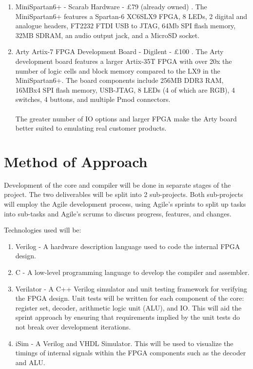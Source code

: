 \documentclass[11pt,a4paper]{article}
\begin{document}
\begin{enumerate}
\item{MiniSpartan6+ - Scarab Hardware - £79 (already owned) \citep{scarabhardware}. The MiniSpartan6+ features a Spartan-6 XC6SLX9 FPGA, 8 LEDs, 2 digital and analogue headers, FT2232 FTDI USB to JTAG, 64Mb SPI flash memory, 32MB SDRAM, an audio output jack, and a MicroSD socket.}

\item{Arty Artix-7 FPGA Development Board - Digilent - £100 \citep{arty}. The Arty development board features a larger Artix-35T FPGA with over 20x the number of logic cells and block memory compared to the LX9 in the MiniSpartan6+. The board components include 256MB DDR3 RAM, 16MBx4 SPI flash memory, USB-JTAG, 8 LEDs (4 of which are RGB), 4 switches, 4 buttons, and multiple Pmod connectors.
\\\\
The greater number of IO options and larger FPGA make the Arty board better suited to emulating real customer products.
}
\end{enumerate}

\section{Method of Approach}
Development of the core and compiler will be done in separate stages of the project. The two deliverables will be split into 2 sub-projects. Both sub-projects will employ the Agile development process, using Agile's sprints to split up tasks into sub-tasks and Agile's scrums to discuss progress, features, and changes.

Technologies used will be:
\begin{enumerate}
\item{Verilog - A hardware description language used to code the internal FPGA design.}

\item{C - A low-level programming language to develop the compiler and assembler.}

\item{Verilator - A C++ Verilog simulator and unit testing framework for verifying the FPGA design. Unit tests will be written for each component of the core: register set, decoder, arithmetic logic unit (ALU), and IO. This will aid the sprint approach by ensuring that requirements implied by the unit tests do not break over development iterations.}

\item{iSim - A Verilog and VHDL Simulator. This will be used to visualize the timings of internal signals within the FPGA components such as the decoder and ALU.}
\end{enumerate}
\end{document}
